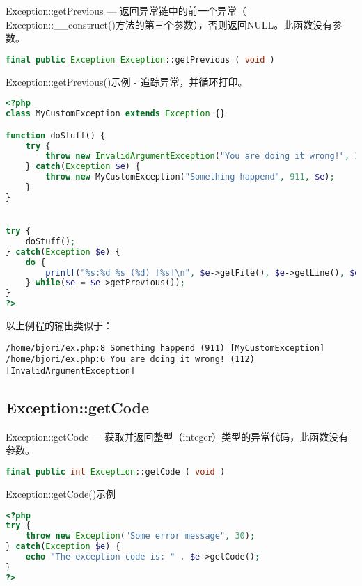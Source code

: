 Exception::getPrevious — 返回异常链中的前一个异常（ Exception::\_\_construct()方法的第三个参数），否则返回NULL。此函数没有参数。

\begin{lstlisting}[language=PHP]
final public Exception Exception::getPrevious ( void )
\end{lstlisting}



\begin{example}
Exception::getPrevious()示例 - 追踪异常，并循环打印。
\begin{lstlisting}[language=PHP]
<?php
class MyCustomException extends Exception {}

function doStuff() {
    try {
        throw new InvalidArgumentException("You are doing it wrong!", 112);
    } catch(Exception $e) {
        throw new MyCustomException("Something happend", 911, $e);
    }
}


try {
    doStuff();
} catch(Exception $e) {
    do {
        printf("%s:%d %s (%d) [%s]\n", $e->getFile(), $e->getLine(), $e->getMessage(), $e->getCode(), get_class($e));
    } while($e = $e->getPrevious());
}
?>
\end{lstlisting}
\end{example}


以上例程的输出类似于：

\begin{verbatim}
/home/bjori/ex.php:8 Something happend (911) [MyCustomException]
/home/bjori/ex.php:6 You are doing it wrong! (112) [InvalidArgumentException]
\end{verbatim}




\subsection{Exception::getCode}


Exception::getCode — 获取并返回整型（integer）类型的异常代码，此函数没有参数。


\begin{lstlisting}[language=PHP]
final public int Exception::getCode ( void )
\end{lstlisting}



\begin{example}
Exception::getCode()示例
\begin{lstlisting}[language=PHP]
<?php
try {
    throw new Exception("Some error message", 30);
} catch(Exception $e) {
    echo "The exception code is: " . $e->getCode();
}
?>
\end{lstlisting}
\end{example}

